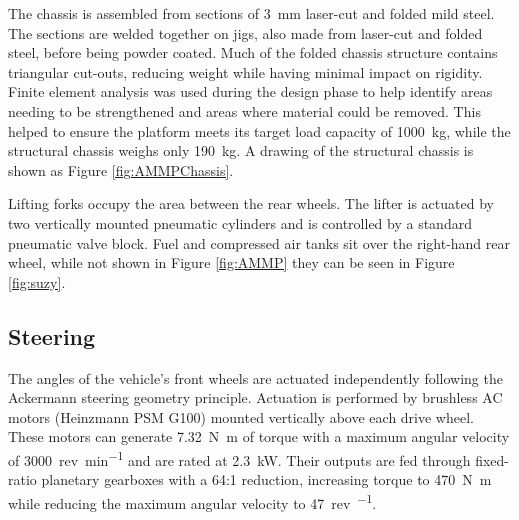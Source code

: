 \documentclass[preprint,authoryear,12pt]{elsarticle}
\begin{document}
        The chassis is assembled from sections of \SI{3}{\milli\meter} laser-cut and folded mild steel.
        The sections are welded together on jigs, also made from laser-cut and folded steel, before being powder coated.
        Much of the folded chassis structure contains triangular cut-outs, reducing weight while having minimal impact on rigidity.
        Finite element analysis was used during the design phase to help identify areas needing to be strengthened and areas where material could be removed.
        This helped to ensure the platform meets its target load capacity of \SI{1000}{\kilo\gram}, while the structural chassis weighs only \SI{190}{\kilo\gram}.
        A drawing of the structural chassis is shown as Figure \ref{fig:AMMPChassis}.

        Lifting forks occupy the area between the rear wheels.
        The lifter is actuated by two vertically mounted pneumatic cylinders and is controlled by a standard pneumatic valve block.
        Fuel and compressed air tanks sit over the right-hand rear wheel, while not shown in Figure \ref{fig:AMMP} they can be seen in Figure \ref{fig:suzy}.

    \subsection{Steering}
    \label{sub:steering}

        The angles of the vehicle's front wheels are actuated independently following the Ackermann steering geometry principle.
        Actuation is performed by brushless AC motors (Heinzmann PSM G100) mounted vertically above each drive wheel.
        These motors can generate \SI{7.32}{\newton\meter} of torque with a maximum angular velocity of \SI{3000}{rev\per\minute} and are rated at \SI{2.3}{\kilo\watt}.
        Their outputs are fed through fixed-ratio planetary gearboxes with a 64:1 reduction, increasing torque to \SI{470}{\newton\meter} while reducing the maximum angular velocity to \SI{47}{rev\per\min}.
\end{document}
